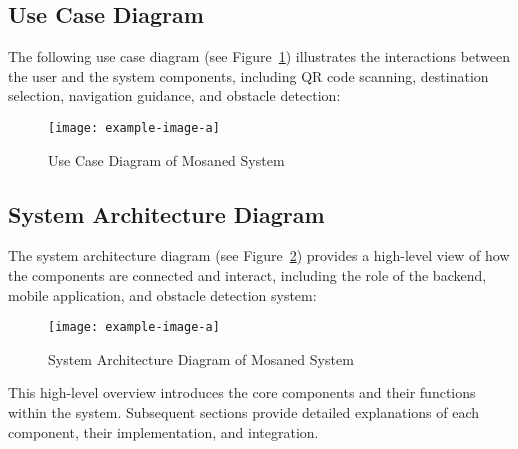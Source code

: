 \subsection{Use Case Diagram}

The following use case diagram (see Figure~\ref{fig:use_case_diagram}) illustrates the interactions between the user and the system components, including QR code scanning, destination selection, navigation guidance, and obstacle detection:

\begin{figure}[h]
	\centering
	\texttt{[image: example-image-a]}
	\caption{Use Case Diagram of Mosaned System}
	\label{fig:use_case_diagram}
\end{figure}

\subsection{System Architecture Diagram}

The system architecture diagram (see Figure~\ref{fig:system_architecture}) provides a high-level view of how the components are connected and interact, including the role of the backend, mobile application, and obstacle detection system:

\begin{figure}[h]
	\centering
	\texttt{[image: example-image-a]}
	\caption{System Architecture Diagram of Mosaned System}
	\label{fig:system_architecture}
\end{figure}

This high-level overview introduces the core components and their functions within the system. Subsequent sections provide detailed explanations of each component, their implementation, and integration.
